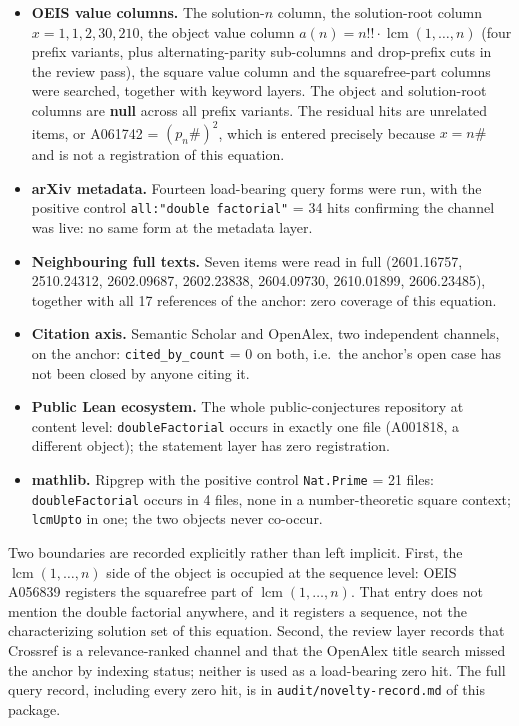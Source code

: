 \documentclass[11pt]{article}
\begin{document}
\begin{itemize}
\item \textbf{OEIS value columns.} The solution-$n$ column, the solution-root column
      $x = 1,1,2,30,210$, the object value column
      $a(n) = n!! \cdot \operatorname{lcm}(1,\dots,n)$ (four prefix variants, plus
      alternating-parity sub-columns and drop-prefix cuts in the review pass), the square
      value column and the squarefree-part columns were searched, together with keyword
      layers. The object and solution-root columns are \textbf{null} across all prefix
      variants. The residual hits are unrelated items, or A061742 = $(p_n\#)^2$, which is
      entered precisely because $x = n\#$ and is not a registration of this equation.
\item \textbf{arXiv metadata.} Fourteen load-bearing query forms were run, with the
      positive control \texttt{all:"double factorial"} = 34 hits confirming the channel was
      live: no same form at the metadata layer.
\item \textbf{Neighbouring full texts.} Seven items were read in full (2601.16757,
      2510.24312, 2602.09687, 2602.23838, 2604.09730, 2610.01899, 2606.23485), together
      with all 17 references of the anchor: zero coverage of this equation.
\item \textbf{Citation axis.} Semantic Scholar and OpenAlex, two independent channels, on
      the anchor: \texttt{cited\_by\_count} = 0 on both, i.e.\ the anchor's open case has
      not been closed by anyone citing it.
\item \textbf{Public Lean ecosystem.} The whole public-conjectures repository at content
      level: \texttt{doubleFactorial} occurs in exactly one file (A001818, a different
      object); the statement layer has zero registration.
\item \textbf{mathlib.} Ripgrep with the positive control \texttt{Nat.Prime} = 21 files:
      \texttt{doubleFactorial} occurs in 4 files, none in a number-theoretic square
      context; \texttt{lcmUpto} in one; the two objects never co-occur.
\end{itemize}

Two boundaries are recorded explicitly rather than left implicit. First, the
$\operatorname{lcm}(1,\dots,n)$ side of the object is occupied at the sequence level:
OEIS A056839 registers the squarefree part of $\operatorname{lcm}(1,\dots,n)$. That entry
does not mention the double factorial anywhere, and it registers a sequence, not the
characterizing solution set of this equation. Second, the review layer records that
Crossref is a relevance-ranked channel and that the OpenAlex title search missed the anchor
by indexing status; neither is used as a load-bearing zero hit. The full query record,
including every zero hit, is in \texttt{audit/novelty-record.md} of this package.
\end{document}
